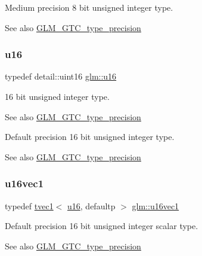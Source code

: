 Medium precision 8 bit unsigned integer type. \begin{DoxySeeAlso}{See also}
\hyperlink{group__gtc__type__precision}{G\+L\+M\+\_\+\+G\+T\+C\+\_\+type\+\_\+precision} 
\end{DoxySeeAlso}
\mbox{\label{group__gtc__type__precision_gae7a1571503f83d2264ddfa705a6b082a}} 
\subsubsection{\texorpdfstring{u16}{u16}}
{\footnotesize\ttfamily typedef detail\+::uint16 \hyperlink{group__gtc__type__precision_gae7a1571503f83d2264ddfa705a6b082a}{glm\+::u16}}

16 bit unsigned integer type. \begin{DoxySeeAlso}{See also}
\hyperlink{group__gtc__type__precision}{G\+L\+M\+\_\+\+G\+T\+C\+\_\+type\+\_\+precision}
\end{DoxySeeAlso}
Default precision 16 bit unsigned integer type. \begin{DoxySeeAlso}{See also}
\hyperlink{group__gtc__type__precision}{G\+L\+M\+\_\+\+G\+T\+C\+\_\+type\+\_\+precision} 
\end{DoxySeeAlso}
\mbox{\label{group__gtc__type__precision_ga809cb55e5fed3456686aae96e7e8684c}} 
\subsubsection{\texorpdfstring{u16vec1}{u16vec1}}
{\footnotesize\ttfamily typedef \hyperlink{structglm_1_1tvec1}{tvec1}$<$ \hyperlink{group__gtc__type__precision_gae7a1571503f83d2264ddfa705a6b082a}{u16}, defaultp $>$ \hyperlink{group__gtc__type__precision_ga809cb55e5fed3456686aae96e7e8684c}{glm\+::u16vec1}}

Default precision 16 bit unsigned integer scalar type. \begin{DoxySeeAlso}{See also}
\hyperlink{group__gtc__type__precision}{G\+L\+M\+\_\+\+G\+T\+C\+\_\+type\+\_\+precision} 
\end{DoxySeeAlso}
\mbox{\label{group__gtc__type__precision_ga10e8900b9610f930772aa55aee8e3121}} 
